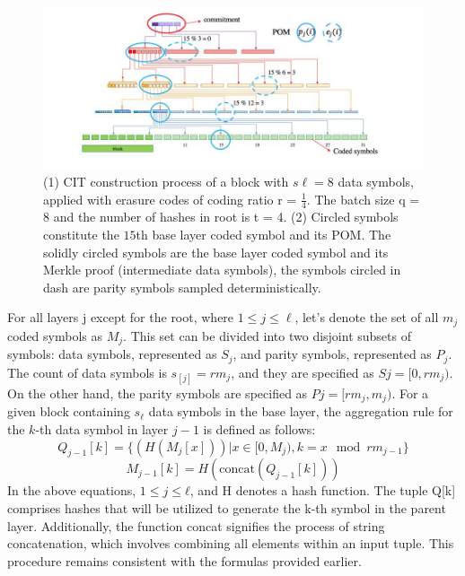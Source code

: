 \begin{center}
	\begin{figure}
		\centering
		\includegraphics[width=0.8\linewidth]{Fig/L12_F2}
		\caption{(1) CIT construction process of a block with $s\ell = 8$ data symbols, applied with erasure codes of coding ratio r = $\frac{1}{4}$. The batch size q = 8 and the number of hashes in root is t = 4. (2) Circled symbols constitute the $15$th base layer coded symbol and its POM. The solidly circled symbols are the base layer coded symbol and its Merkle proof (intermediate data symbols), the symbols circled in dash are parity symbols sampled deterministically.
		}
		\label{fig:f1}
	\end{figure}
\end{center}
For all layers j except for the root, where $1 \leq j \leq \ell$, let's denote the set of all $m_{j}$ coded symbols as $M_{j}$. This set can be divided into two disjoint subsets of symbols: data symbols, represented as $S_{j}$, and parity symbols, represented as $P_{j}$. The count of data symbols is $s_[j] = rm_{j}$, and they are specified as $Sj = [0, rm_{j})$. On the other hand, the parity symbols are specified as $Pj = [rm_{j}, m_{j})$. For a given block containing $s_{ℓ}$ data symbols in the base layer, the aggregation rule for the $k$-th data symbol in layer $j - 1$ is defined as follows:
\begin{equation} 
	Q_{j-1}[k] = \{(H(M_{j}[x])) | x \in [0, M_{j}), k = x \mod rm_{j - 1}\}
\end{equation}
\begin{equation} 
	M_{j-1}[k] = H(\text{concat}(Q_{j-1}[k])) 
\end{equation}
In the above equations, $1 ≤ j ≤ ℓ$, and H denotes a hash function. The tuple Q[k] comprises hashes that will be utilized to generate the k-th symbol in the parent layer. Additionally, the function concat signifies the process of string concatenation, which involves combining all elements within an input tuple. This procedure remains consistent with the formulas provided earlier.\\

